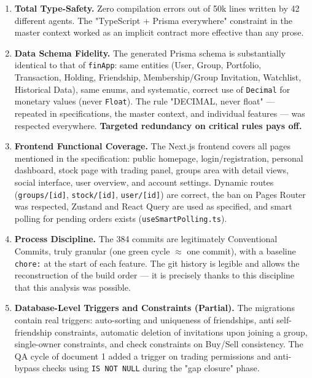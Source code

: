 \documentclass[11pt,a4paper]{article}
\newcommand{\file}[1]{\texttt{\small #1}}
\begin{document}
	\begin{enumerate}[leftmargin=1.8em]
		\item \textbf{Total Type-Safety.} Zero compilation errors out of 50k lines written by 42 different agents. The "TypeScript + Prisma everywhere" constraint in the master context worked as an implicit contract more effective than any prose.
		
		\item \textbf{Data Schema Fidelity.} The generated Prisma schema is substantially identical to that of \file{finApp}: same entities (User, Group, Portfolio, Transaction, Holding, Friendship, Membership/Group Invitation, Watchlist, Historical Data), same enums, and systematic, correct use of \file{Decimal} for monetary values (never \file{Float}). The rule "DECIMAL, never float" --- repeated in specifications, the master context, and individual features --- was respected everywhere. \textbf{Targeted redundancy on critical rules pays off.}
		
		\item \textbf{Frontend Functional Coverage.} The Next.js frontend covers all pages mentioned in the specification: public homepage, login/registration, personal dashboard, stock page with trading panel, groups area with detail views, social interface, user overview, and account settings. Dynamic routes (\file{groups/[id]}, \file{stock/[id]}, \file{user/[id]}) are correct, the ban on Pages Router was respected, Zustand and React Query are used as specified, and smart polling for pending orders exists (\file{useSmartPolling.ts}).
		
		\item \textbf{Process Discipline.} The 384 commits are legitimately Conventional Commits, truly granular (one green cycle $\approx$ one commit), with a baseline \file{chore:} at the start of each feature. The git history is legible and allows the reconstruction of the build order --- it is precisely thanks to this discipline that this analysis was possible.
		
		\item \textbf{Database-Level Triggers and Constraints (Partial).} The migrations contain real triggers: auto-sorting and uniqueness of friendships, anti self-friendship constraints, automatic deletion of invitations upon joining a group, single-owner constraints, and check constraints on Buy/Sell consistency. The QA cycle of document 1 added a trigger on trading permissions and anti-bypass checks using \file{IS NOT NULL} during the "gap closure" phase.
		

\end{enumerate}
\end{document}
